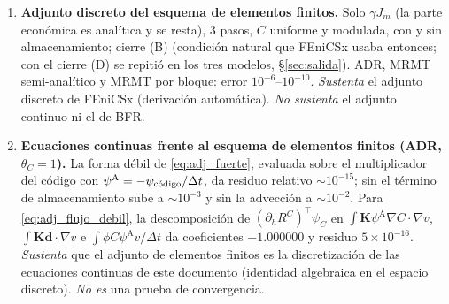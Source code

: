 \documentclass[11pt]{article}
\numberwithin{equation}{section}
\theoremstyle{plain}
\theoremstyle{definition}
\theoremstyle{remark}
\newcommand{\bK}{\mathbf{K}}
\newcommand{\bd}{\mathbf{d}}
\newcommand{\pA}{\psi^{\mathrm A}}          %
\begin{document}
\begin{enumerate}[label=\textbf{V\arabic*.},leftmargin=*,itemsep=0.6em]
\item \textbf{Adjunto discreto del esquema de elementos finitos.} Solo $\gamma J_m$ (la parte económica es analítica y se
  resta), 3 pasos, $C$ uniforme y modulada, con y sin almacenamiento; cierre (B) (condición natural que FEniCSx usaba entonces; con el cierre (D) se repitió en los tres modelos, \S\ref{sec:salida}). ADR, MRMT semi-analítico y MRMT por bloque:
  error $10^{-6}$--$10^{-10}$. \emph{Sustenta} el adjunto discreto de FEniCSx (derivación automática). \emph{No sustenta} el adjunto continuo ni el de BFR.

\item \textbf{Ecuaciones continuas frente al esquema de elementos finitos (ADR, $\theta_C=1$).} La forma débil de
  \eqref{eq:adj_fuerte}, evaluada sobre el multiplicador del código con $\pA=-\psi_{\rm c\acute{o}digo}/\Delta t$, da residuo
  relativo $\sim10^{-15}$; sin el término de almacenamiento sube a $\sim10^{-3}$ y sin la advección a $\sim10^{-2}$. Para
  \eqref{eq:adj_flujo_debil}, la descomposición de $(\partial_hR^C)^\top\psi_C$ en $\int\bK\pA\nabla C\cdot\nabla v$,
  $\int\bK\bd\cdot\nabla v$ e $\int\phi C\pA v/\Delta t$ da coeficientes $-1.000000$ y residuo $5\times10^{-16}$.
  \emph{Sustenta} que el adjunto de elementos finitos es la discretización de las ecuaciones continuas de este documento (identidad algebraica en el espacio discreto). \emph{No es} una prueba de convergencia.


\end{enumerate}
\end{document}
